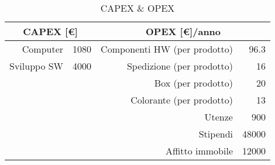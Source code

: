 \begin{table}[!h]
\centering
\begin{tabular}{r@{\qquad}l|r@{\qquad}r}
 \multicolumn{2}{c}{CAPEX [\euro]}
& \multicolumn{2}{|c}{OPEX [\euro]/anno}
\\          
\hline
 Computer    & 1080  & Componenti HW (per prodotto) & 96.3 \\
 Sviluppo SW & 4000  & Spedizione    (per prodotto) & 16   \\ 
             &       & Box           (per prodotto) & 20   \\
             &       & Colorante     (per prodotto) & 13   \\
             &       & Utenze           & 900  \\
             &       & Stipendi         & 48000  \\
             &       & Affitto immobile & 12000  \\
\end{tabular}
\caption{CAPEX \& OPEX}
\label{tab:pex}
\end{table}
